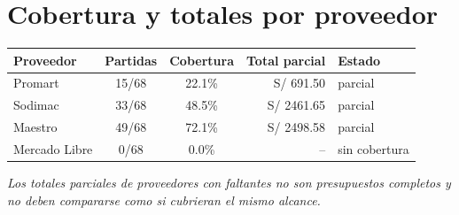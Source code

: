 \documentclass[11pt,a4paper]{article}
\begin{document}
\section{Cobertura y totales por proveedor}
\begin{tabular}{lccrl}
\toprule Proveedor & Partidas & Cobertura & Total parcial & Estado \\ \midrule
Promart & 15/68 & 22.1\% & S/ 691.50 & parcial \\
Sodimac & 33/68 & 48.5\% & S/ 2461.65 & parcial \\
Maestro & 49/68 & 72.1\% & S/ 2498.58 & parcial \\
Mercado Libre & 0/68 & 0.0\% & -- & sin cobertura \\
\bottomrule
\end{tabular}

\textit{Los totales parciales de proveedores con faltantes no son presupuestos completos y no deben compararse como si cubrieran el mismo alcance.}
\end{document}

